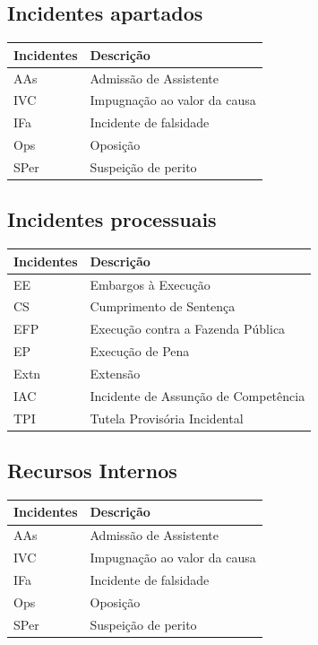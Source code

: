 \documentclass[
]{book}
\theoremstyle{definition}
\theoremstyle{definition}
\theoremstyle{definition}
\theoremstyle{definition}
\theoremstyle{remark}
\begin{document}
\hypertarget{incidentes-apartados}{%
\subsection{Incidentes apartados}\label{incidentes-apartados}}

\begin{tabular}{l|l}
\hline
Incidentes & Descrição\\
\hline
AAs & Admissão de Assistente\\
\hline
IVC & Impugnação ao valor da causa\\
\hline
IFa & Incidente de falsidade\\
\hline
Ops & Oposição\\
\hline
SPer & Suspeição de perito\\
\hline
\end{tabular}

\hypertarget{incidentes-processuais}{%
\subsection{Incidentes processuais}\label{incidentes-processuais}}

\begin{tabular}{l|l}
\hline
Incidentes & Descrição\\
\hline
EE & Embargos à Execução\\
\hline
CS & Cumprimento de Sentença\\
\hline
EFP & Execução contra a Fazenda Pública\\
\hline
EP & Execução de Pena\\
\hline
Extn & Extensão\\
\hline
IAC & Incidente de Assunção de Competência\\
\hline
TPI & Tutela Provisória Incidental\\
\hline
\end{tabular}

\hypertarget{recursos-internos}{%
\subsection{Recursos Internos}\label{recursos-internos}}

\begin{tabular}{l|l}
\hline
Incidentes & Descrição\\
\hline
AAs & Admissão de Assistente\\
\hline
IVC & Impugnação ao valor da causa\\
\hline
IFa & Incidente de falsidade\\
\hline
Ops & Oposição\\
\hline
SPer & Suspeição de perito\\
\hline
\end{tabular}
\end{document}
